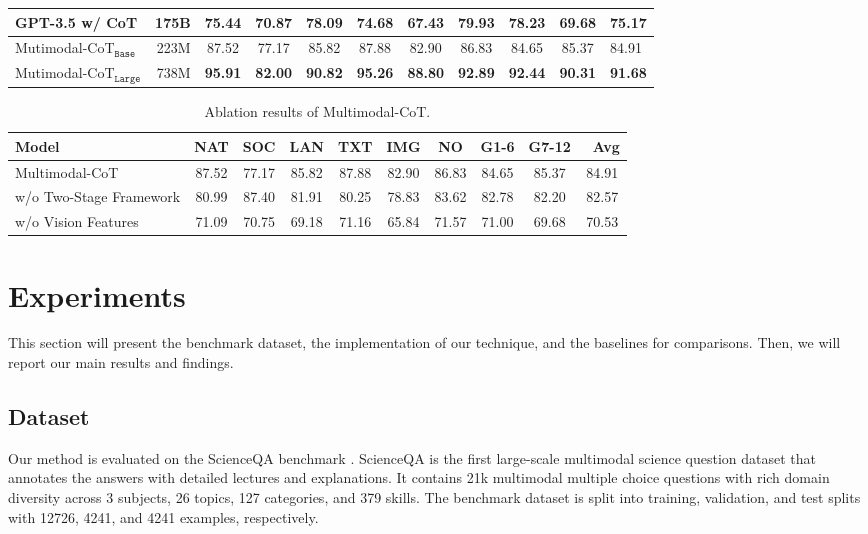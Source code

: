 \documentclass[nohyperref]{article}
\theoremstyle{plain}
\theoremstyle{definition}
\theoremstyle{remark}
\begin{document}
\begin{table*}[t]
{\begin{tabular}{l|r|cccccccc|l}
GPT-3.5 w/ CoT \citep{lu2022learn} & 175B& {75.44} & {70.87} & {78.09} & {74.68} & {67.43} & {{79.93}} & {78.23} & {69.68} & {75.17} \\
 \midrule
 Mutimodal-CoT$_\texttt{Base}$ & 223M & {87.52} & {77.17} & {85.82} & {87.88} & {82.90} & {86.83} & {84.65} & {85.37} & {84.91} \\
 Mutimodal-CoT$_\texttt{Large}$ & 738M & \textbf{95.91} & \textbf{82.00} & \textbf{90.82} & \textbf{95.26} & \textbf{88.80} & \textbf{92.89} & \textbf{92.44} & \textbf{90.31} & \textbf{91.68} \\
 \bottomrule
\end{tabular}
}
\vspace{-3mm}
 \label{tab:main_results}
\end{table*}


\begin{table*}[t]
\centering\small
\caption{Ablation results of Multimodal-CoT.}
\renewcommand\tabcolsep{9.8pt} {
\begin{tabular}{l|cccccccc|c}
\toprule
 Model  & NAT & SOC & LAN & TXT & IMG & NO & G1-6 & G7-12 & ~Avg \\
 \midrule
Multimodal-CoT & {87.52} & {77.17} & {85.82} & {87.88} & {82.90} & {86.83} & {84.65} & {85.37} & {84.91} \\
\quad w/o Two-Stage Framework & 80.99 & 87.40 & 81.91 & 80.25 & 78.83 & 83.62 & 82.78 & 82.20 & 82.57 \\
\quad w/o Vision Features & 71.09 & 70.75 & 69.18 & 71.16 & 65.84 & 71.57 & 71.00 & 69.68 & 70.53 \\
\bottomrule
\end{tabular}
}
 \label{tab:abl_results}
 \vspace{-3mm}
\end{table*}


\section{Experiments}
This section will present the benchmark dataset, the implementation of our technique, and the baselines for comparisons. Then, we will report our main results and findings.
\subsection{Dataset}
Our method is evaluated on the ScienceQA benchmark \citep{lu2022learn}. ScienceQA is the first large-scale multimodal science question dataset that annotates the answers with detailed lectures and explanations. It contains 21k multimodal multiple choice questions with rich domain diversity across 3 subjects, 26 topics, 127 categories, and 379 skills. The benchmark dataset is split into training, validation, and test splits with 12726, 4241, and 4241 examples, respectively.
\end{document}
